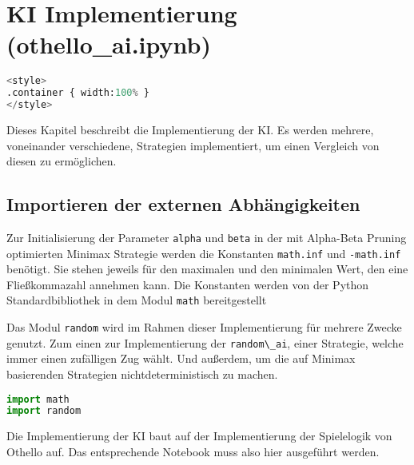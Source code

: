 \hypertarget{ki-implementierung-othello_ai.ipynb}{%
\section{KI Implementierung
(othello\_ai.ipynb)}\label{ki-implementierung-othello_ai.ipynb}}

\label{sec:aiimpl}

\begin{lstlisting}[language=Python]
%%HTML
<style>
.container { width:100% }
</style>
\end{lstlisting}

Dieses Kapitel beschreibt die Implementierung der \ac{KI}. Es werden
mehrere, voneinander verschiedene, Strategien implementiert, um einen
Vergleich von diesen zu ermöglichen.

\hypertarget{importieren-der-externen-abhuxe4ngigkeiten}{%
\subsection{Importieren der externen
Abhängigkeiten}\label{importieren-der-externen-abhuxe4ngigkeiten}}

Zur Initialisierung der Parameter \passthrough{\lstinline!alpha!} und
\passthrough{\lstinline!beta!} in der mit Alpha-Beta Pruning optimierten
Minimax Strategie werden die Konstanten
\passthrough{\lstinline!math.inf!} und
\passthrough{\lstinline!-math.inf!} benötigt. Sie stehen jeweils für den
maximalen und den minimalen Wert, den eine Fließkommazahl annehmen kann.
Die Konstanten werden von der Python Standardbibliothek in dem Modul
\passthrough{\lstinline!math!} bereitgestellt

Das Modul \passthrough{\lstinline!random!} wird im Rahmen dieser
Implementierung für mehrere Zwecke genutzt. Zum einen zur
Implementierung der \passthrough{\lstinline!random\_ai!}, einer
Strategie, welche immer einen zufälligen Zug wählt. Und außerdem, um die
auf Minimax basierenden Strategien nichtdeterministisch zu machen.

\begin{lstlisting}[language=Python]
import math
import random
\end{lstlisting}

Die Implementierung der \ac{KI} baut auf der Implementierung der
Spielelogik von Othello auf. Das entsprechende Notebook muss also hier
ausgeführt werden.

\begin{lstlisting}[language=Python]
%run othello_game.ipynb
\end{lstlisting}

